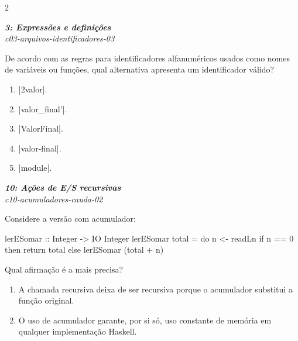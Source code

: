 \documentclass[a4paper,10pt,brazil]{article}
\begin{document}
\begin{multicols}{2}
\begin{enumerate}
\end{enumerate}

\begin{flushright}
  \footnotesize
  \textit{\textbf{3: Expressões e definições}}\\
  \textit{c03-arquivos-identificadores-03}\\

\end{flushright}
De acordo com as regras para identificadores alfanuméricos usados como nomes de variáveis ou funções, qual alternativa apresenta um identificador válido?

\begin{enumerate}
  \item \haskellinline|2valor|.

  \item \haskellinline|valor_final'|.

  \item \haskellinline|ValorFinal|.

  \item \haskellinline|valor-final|.

  \item \haskellinline|module|.


\end{enumerate}

\begin{flushright}
  \footnotesize
  \textit{\textbf{10: Ações de E/S recursivas}}\\
  \textit{c10-acumuladores-cauda-02}\\

\end{flushright}
Considere a versão com acumulador:

\begin{haskellcode}
lerESomar :: Integer -> IO Integer
lerESomar total = do
  n <- readLn
  if n == 0
    then return total
    else lerESomar (total + n)
\end{haskellcode}

Qual afirmação é a mais precisa?

\begin{enumerate}
  \item A chamada recursiva deixa de ser recursiva porque o acumulador substitui a função original.

  \item O uso de acumulador garante, por si só, uso constante de memória em qualquer implementação Haskell.


\end{enumerate}
\end{multicols}
\end{document}
